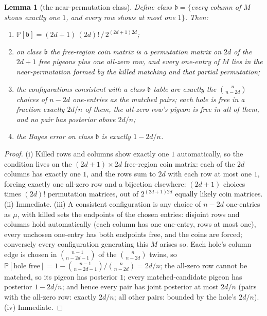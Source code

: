 \documentclass[11pt]{article}
\newtheorem{lemma}[theorem]{Lemma}
\theoremstyle{definition}
\theoremstyle{remark}
\newcommand{\Prob}{\mathbb{P}}
\begin{document}
\begin{lemma}[the near-permutation class]\label{lem:classb}
Define class $\mathfrak{b}=\{$every column of $M$ shows exactly one
$1$, and every row shows at most one $1\}$.  Then:
\begin{enumerate}
\item[(i)] $\Prob[\mathfrak{b}]=(2d+1)\,(2d)!\,/\,2^{(2d+1)2d}$;
\item[(ii)] on class $\mathfrak{b}$ the free-region coin matrix is a
permutation matrix on $2d$ of the $2d+1$ free pigeons plus one
all-zero row, and every one-entry of $M$ lies in the near-permutation
formed by the killed matching and that partial permutation;
\item[(iii)] the configurations consistent with a class-$\mathfrak{b}$
table are exactly the $\binom{n}{n-2d}$ choices of $n-2d$ one-entries
as the matched pairs; each hole is free in a fraction exactly $2d/n$
of them, the all-zero row's pigeon is free in all of them, and no pair
has posterior above $2d/n$;
\item[(iv)] the Bayes error on class $\mathfrak{b}$ is exactly
$1-2d/n$.
\end{enumerate}
\end{lemma}

\begin{proof}
(i) Killed rows and columns show exactly one $1$ automatically, so the
condition lives on the $(2d+1)\times 2d$ free-region coin matrix: each
of the $2d$ columns has exactly one $1$, and the rows sum to $2d$ with
each row at most one $1$, forcing exactly one all-zero row and a
bijection elsewhere: $(2d+1)$ choices times $(2d)!$ permutation
matrices, out of $2^{(2d+1)2d}$ equally likely coin matrices.
(ii) Immediate.  (iii) A consistent configuration is any choice of
$n-2d$ one-entries as $\mu$, with killed sets the endpoints of the
chosen entries: disjoint rows and columns hold automatically (each
column has one one-entry, rows at most one), every unchosen one-entry
has both endpoints free, and the coins are forced; conversely every
configuration generating this $M$ arises so.  Each hole's column edge
is chosen in $\binom{n-1}{n-2d-1}$ of the $\binom{n}{n-2d}$ twins, so
$\Prob[\text{hole free}]
=1-\binom{n-1}{n-2d-1}\big/\binom{n}{n-2d}=2d/n$; the all-zero row
cannot be matched, so its pigeon has posterior $1$; every
matched-candidate pigeon has posterior $1-2d/n$; and hence every pair
has joint posterior at most $2d/n$ (pairs with the all-zero row:
exactly $2d/n$; all other pairs: bounded by the hole's $2d/n$).
(iv) Immediate.
\end{proof}
\end{document}
